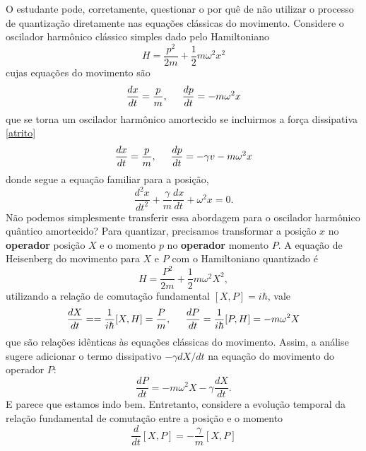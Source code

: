 \documentclass{article}
\begin{document}
O estudante pode, corretamente, questionar o por quê de não utilizar o processo de quantização diretamente nas equações clássicas do movimento. Considere o oscilador harmônico clássico simples dado pelo Hamiltoniano
\begin{equation}
    H = \frac{p^2}{2m} + \frac{1}{2}m\omega^2 x^2
\end{equation}
cujas equações do movimento são
\begin{equation}
    \frac{dx}{dt} = \frac{p}{m}, \hspace{0.5cm} \frac{dp}{dt}=-m\omega^2 x
\end{equation}
que se torna um oscilador harmônico amortecido se incluirmos a força dissipativa \eqref{atrito}
\begin{equation}
    \frac{dx}{dt} = \frac{p}{m}, \hspace{0.5cm} \frac{dp}{dt}=-\gamma v-m\omega^2 x
\end{equation}
donde segue a equação familiar para a posição,
\begin{equation}
    \frac{d^2 x}{dt^2} + \frac{\gamma}{m} \frac{dx}{dt} + \omega^2 x = 0.
\end{equation}
Não podemos simplesmente transferir essa abordagem para o oscilador harmônico quântico amortecido? Para quantizar, precisamos transformar a posição $x$ no \textbf{operador} posição $X$ e o momento $p$ no \textbf{operador} momento $P$. A equação de Heisenberg do movimento para $X$ e $P$ com o Hamiltoniano quantizado é
\begin{equation}
    H = \frac{P^2}{2m} + \frac{1}{2}m\omega^2 X^2,
\end{equation}
utilizando a relação de comutação fundamental $[X,P] = i\hbar$, vale
\begin{equation}
    \frac{dX}{dt} == \frac{1}{i\hbar}[X,H] = \frac{P}{m}, \hspace{0.5cm} \frac{dP}{dt} = \frac{1}{i\hbar}[P,H] = -m\omega^2 X
\end{equation}
que são relações idênticas às equações clássicas do movimento. Assim, a análise sugere adicionar o termo dissipativo $-\gamma dX/dt$ na equação do movimento do operador $P$:
\begin{equation}
    \frac{dP}{dt} = -m\omega^2 X - \gamma \frac{dX}{dt}.
\end{equation}
E parece que estamos indo bem. Entretanto, considere a evolução temporal da relação fundamental de comutação entre a posição e o momento
\begin{equation}
    \frac{d}{dt}[X,P] = - \frac{\gamma}{m}[X,P]
\end{equation}
\end{document}
